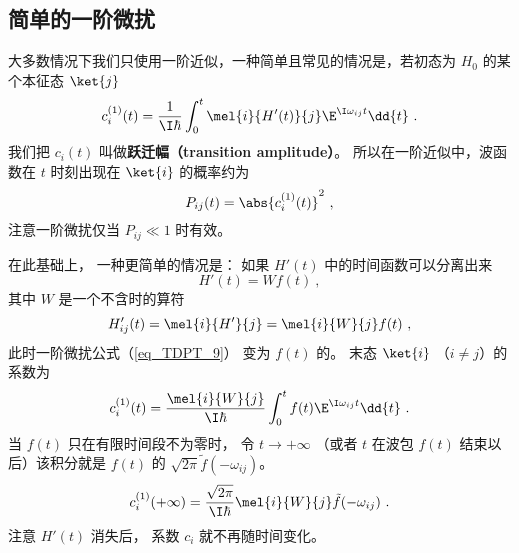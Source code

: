 \subsection{简单的一阶微扰}
大多数情况下我们只使用一阶近似，一种简单且常见的情况是，若初态为 $H_0$ 的某个本征态 $\ket{j}$
\begin{equation}\label{eq_TDPT_13}
c_i^{(1)}(t) = \frac{1}{\I\hbar} \int_0^t \mel{i}{H'(t)}{j} \E^{\I\omega_{ij} t} \dd{t}~.
\end{equation}
我们把 $c_i(t)$ 叫做\textbf{跃迁幅（transition amplitude）}。 所以在一阶近似中，波函数在 $t$ 时刻出现在 $\ket{i}$ 的概率约为
\begin{equation}
P_{ij}(t) = \abs{c_i^{(1)}(t)}^2~,
\end{equation}
注意一阶微扰仅当 $P_{ij} \ll 1$ 时有效。

在此基础上， 一种更简单的情况是： 如果 $H'(t)$ 中的时间函数可以分离出来
\begin{equation}
H'(t) = W f(t)~,
\end{equation}
其中 $W$ 是一个不含时的算符
\begin{equation}
H'_{ij}(t) = \mel{i}{H'}{j} = \mel{i}{W}{j}f(t)~,
\end{equation}
此时一阶微扰公式（\autoref{eq_TDPT_9}） 变为 $f(t)$ 的。 末态 $\ket{i}$ （$i \neq j$）的系数为
\begin{equation}
c_i^{(1)}(t) = \frac{\mel{i}{W}{j}}{\I\hbar} \int_0^t f(t)\E^{\I\omega_{ij} t} \dd{t}~.
\end{equation}
当 $f(t)$ 只在有限时间段不为零时， 令 $t\to+\infty$ （或者 $t$ 在波包 $f(t)$ 结束以后）该积分就是 $f(t)$ 的 $\sqrt{2\pi}\tilde f(-\omega_{ij})$。
\begin{equation}\label{eq_TDPT_12}
c_i^{(1)}(+\infty) = \frac{\sqrt{2\pi}}{\I\hbar} \mel{i}{W}{j}\tilde f(-\omega_{ij})~.
\end{equation}
注意 $H'(t)$ 消失后， 系数 $c_i$ 就不再随时间变化。

